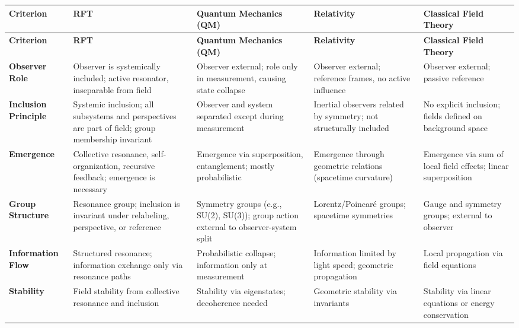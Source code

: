 \documentclass[12pt]{article}
\begin{document}
	\renewcommand{\arraystretch}{1.3}
	\begin{center}
		\begin{longtable}{|p{4cm}|p{3cm}|p{3cm}|p{3cm}|p{3cm}|}
			\hline
			\textbf{Criterion} & \textbf{RFT} & \textbf{Quantum Mechanics (QM)} & \textbf{Relativity} & \textbf{Classical Field Theory} \\
			\hline
			\endfirsthead
			
			\hline
			\textbf{Criterion} & \textbf{RFT} & \textbf{Quantum Mechanics (QM)} & \textbf{Relativity} & \textbf{Classical Field Theory} \\
			\hline
			\endhead
			
			\hline
			\endfoot
			
			\hline
			\endlastfoot
			
			\textbf{Observer Role} & Observer is systemically included; active resonator, inseparable from field & Observer external; role only in measurement, causing state collapse & Observer external; reference frames, no active influence & Observer external; passive reference \\
			\hline
			\textbf{Inclusion Principle} & Systemic inclusion; all subsystems and perspectives are part of field; group membership invariant & Observer and system separated except during measurement & Inertial observers related by symmetry; not structurally included & No explicit inclusion; fields defined on background space \\
			\hline
			\textbf{Emergence} & Collective resonance, self-organization, recursive feedback; emergence is necessary & Emergence via superposition, entanglement; mostly probabilistic & Emergence through geometric relations (spacetime curvature) & Emergence via sum of local field effects; linear superposition \\
			\hline
			\textbf{Group Structure} & Resonance group; inclusion is invariant under relabeling, perspective, or reference & Symmetry groups (e.g., SU(2), SU(3)); group action external to observer-system split & Lorentz/Poincaré groups; spacetime symmetries & Gauge and symmetry groups; external to observer \\
			\hline
			\textbf{Information Flow} & Structured resonance; information exchange only via resonance paths & Probabilistic collapse; information only at measurement & Information limited by light speed; geometric propagation & Local propagation via field equations \\
			\hline
			\textbf{Stability} & Field stability from collective resonance and inclusion & Stability via eigenstates; decoherence needed & Geometric stability via invariants & Stability via linear equations or energy conservation \\

\end{longtable}
\end{center}
\end{document}
